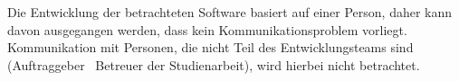 
Die Entwicklung der betrachteten Software basiert auf einer Person, daher kann davon ausgegangen werden, dass kein Kommunikationsproblem vorliegt.
Kommunikation mit Personen, die nicht Teil des Entwicklungsteams sind (Auftraggeber \bzw\ Betreuer der Studienarbeit), wird hierbei nicht betrachtet.

